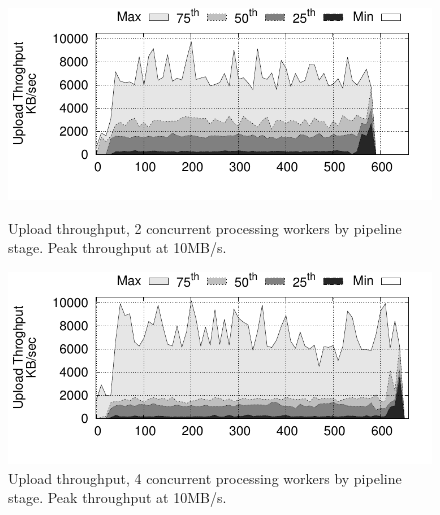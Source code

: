 \begin{figure}[t!]
  \centering
  \includegraphics[scale=0.7]{images/tput_upload_4-datas-2-workers.pdf}
  \caption{Upload throughput, 2 concurrent processing workers by pipeline stage. Peak throughput at 10MB/s.}
  \label{fig:throughput2}
  \includegraphics[scale=0.7]{images/tput_upload_4-datas-4-workers.pdf}
  \caption{Upload throughput, 4 concurrent processing workers by pipeline stage. Peak throughput at 10MB/s.}
  \label{fig:throughput4}
\end{figure}

